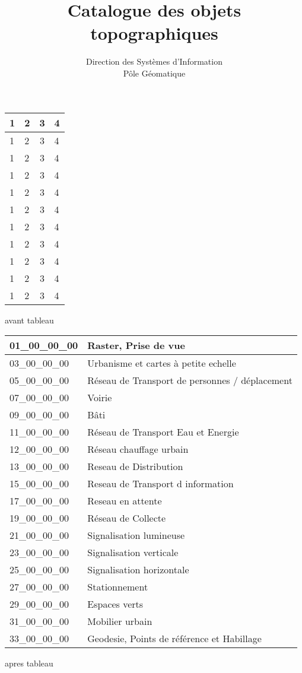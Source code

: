 \documentclass[12pt,titlepage,oneside]{book}
\author{Direction des Systèmes d'Information\\
Pôle Géomatique}
\title{Catalogue des objets topographiques}
\begin{document}
\begin{tabular}{|m{3cm}|m{3cm}|c|m{3cm}|}
\hline
1 & 2 & 3 & 4 \\\hline
1 & 2 & 3 & 4 \\\hline
1 & 2 & 3 & 4 \\\hline
1 & 2 & 3 & 4 \\\hline
1 & 2 & 3 & 4 \\\hline
1 & 2 & 3 & 4 \\\hline
1 & 2 & 3 & 4 \\\hline
1 & 2 & 3 & 4 \\\hline
1 & 2 & 3 & 4 \\\hline
1 & 2 & 3 & 4 \\\hline
1 & 2 & 3 & 4 \\\hline
\end{tabular}

avant tableau
\begin{tabular}{|m{3cm}|m{3cm}|}
\hline
01\_00\_00\_00 & Raster, Prise de vue \\\hline
03\_00\_00\_00 & Urbanisme et cartes à petite echelle \\\hline
05\_00\_00\_00 & Réseau de Transport de personnes / déplacement \\\hline
07\_00\_00\_00 & Voirie \\\hline
09\_00\_00\_00 & Bâti \\\hline
11\_00\_00\_00 & Réseau de Transport Eau et Energie \\\hline
12\_00\_00\_00 & Réseau chauffage urbain \\\hline
13\_00\_00\_00 & Reseau de Distribution \\\hline
15\_00\_00\_00 & Reseau de Transport d information \\\hline
17\_00\_00\_00 & Reseau en attente \\\hline
19\_00\_00\_00 & Réseau de Collecte \\\hline
21\_00\_00\_00 & Signalisation lumineuse \\\hline
23\_00\_00\_00 & Signalisation verticale \\\hline
25\_00\_00\_00 & Signalisation horizontale \\\hline
27\_00\_00\_00 & Stationnement \\\hline
29\_00\_00\_00 & Espaces verts \\\hline
31\_00\_00\_00 & Mobilier urbain \\\hline
33\_00\_00\_00 & Geodesie, Points de référence et Habillage \\\hline
\end{tabular}
apres tableau
\end{document}
